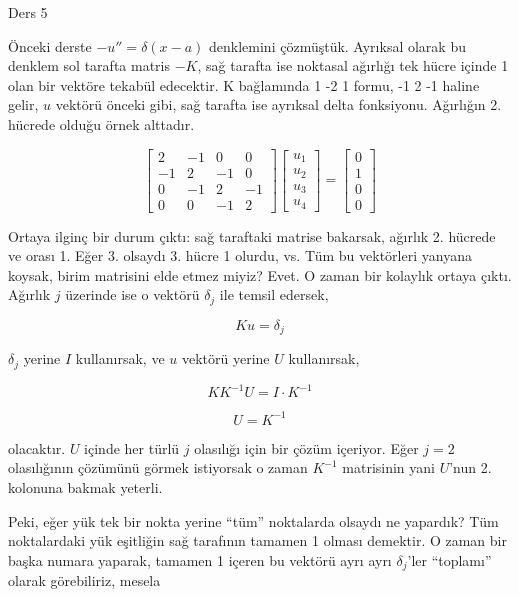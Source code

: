 \documentclass[12pt,fleqn]{article}\usepackage{../../common}
\begin{document}
Ders 5

Önceki derste $-u'' = \delta(x-a)$ denklemini çözmüştük. Ayrıksal olarak bu
denklem sol tarafta matris $-K$, sağ tarafta ise noktasal ağırlığı tek
hücre içinde 1 olan bir vektöre tekabül edecektir. K bağlamında 1 -2 1
formu, -1 2 -1 haline gelir, $u$ vektörü önceki gibi, sağ tarafta ise
ayrıksal delta fonksiyonu. Ağırlığın 2. hücrede olduğu örnek alttadır. 

$$  
\left[\begin{array}{rrrr}
2 & -1 & 0 & 0 \\
-1 & 2 & -1 & 0 \\
0 & -1 & 2 & -1 \\
0 & 0 & -1 & 2 
\end{array}\right]
\left[\begin{array}{c}
u_1 \\
u_2 \\
u_3 \\
u_4
\end{array}\right]
=
\left[\begin{array}{c}
0 \\
1 \\
0 \\
0
\end{array}\right]
$$

Ortaya ilginç bir durum çıktı: sağ taraftaki matrise bakarsak, ağırlık
2. hücrede ve orası 1. Eğer 3. olsaydı 3. hücre 1 olurdu, vs. Tüm bu
vektörleri yanyana koysak, birim matrisini elde etmez miyiz? Evet. O zaman
bir kolaylık ortaya çıktı. Ağırlık $j$ üzerinde ise o vektörü $\delta_j$
ile temsil edersek, 

$$ Ku = \delta_j $$

$\delta_j$ yerine $I$ kullanırsak, ve $u$ vektörü yerine $U$ kullanırsak,

$$ KK^{-1}U = I \cdot K^{-1}$$

$$ U = K^{-1} $$

olacaktır. $U$ içinde her türlü $j$ olasılığı için bir çözüm içeriyor. Eğer
$j=2$ olasılığının çözümünü görmek istiyorsak o zaman $K^{-1}$ matrisinin
yani $U$'nun 2. kolonuna bakmak yeterli.

Peki, eğer yük tek bir nokta yerine ``tüm'' noktalarda olsaydı ne yapardık?
Tüm noktalardaki yük eşitliğin sağ tarafının tamamen 1 olması demektir. O
zaman bir başka numara yaparak, tamamen 1 içeren bu vektörü ayrı ayrı
$\delta_j$'ler ``toplamı'' olarak görebiliriz, mesela
\end{document}
